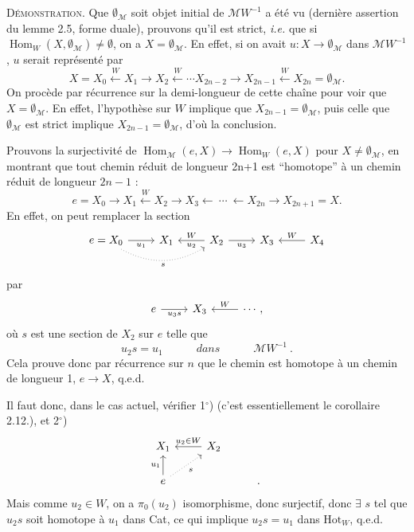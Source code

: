\documentclass[11pt]{article}
\newcommand{\printedpage}[1]{\marginpar{\footnotesize p.~#1}}
\newcommand{\msp}[1]{\marginpar{\footnotesize [#1]}}
\newcommand{\Hom}{\operatorname{Hom}}
\newcommand{\Hot}{\mathrm{Hot}}
\begin{document}
\textsc{Démonstration}. Que $\emptyset_{\mathcal{M}}$ soit objet initial de $\mathcal{M}W^{-1}$ a été vu (dernière assertion du lemme 2.5, forme duale), prouvons qu'il est strict, \textit{i.e.} que si $\Hom_W(X,\emptyset_{\mathcal{M}})\neq\emptyset$, on a $X=\emptyset_{\mathcal{M}}$. En effet, si on avait $u : X\longrightarrow\emptyset_{\mathcal{M}}$ dans $\mathcal{M}W^{-1}$, $u$ serait représenté par
\[
X=X_0\xleftarrow{\ W\ }X_1\longrightarrow X_2\xleftarrow{\ W\ }\cdots X_{2n-2}\longrightarrow X_{2n-1}\xleftarrow{\ W\ }X_{2n}=\emptyset_{\mathcal{M}}.
\]
On procède par récurrence sur la demi-longueur de cette chaîne pour voir que $X=\emptyset_{\mathcal{M}}$. En effet, l'hypothèse sur $W$ implique que $X_{2n-1}=\emptyset_{\mathcal{M}}$, puis celle que $\emptyset_{\mathcal{M}}$ est strict implique
$X_{2n-1}=\emptyset_{\mathcal{M}}$, d'où la conclusion. %

\msp{page 14'}
Prouvons la surjectivité de $\Hom_{\mathcal{M}}(e,X)\longrightarrow\Hom_W(e,X)$ pour $X\neq\emptyset_{\mathcal{M}}$, en montrant que tout chemin réduit de longueur 2n+1 est “homotope” à un chemin réduit de longueur $2n-1$ :
\[
e=X_0\longrightarrow X_1\xleftarrow{\ W\ }X_2\longrightarrow X_3\longleftarrow\ \cdots\ \longleftarrow X_{2n}\longrightarrow X_{2n+1}=X.
\]
En effet, on peut remplacer la section
\[
\begin{tikzcd}
e=X_0 \arrow[r,"u_1"'] \arrow[rr,dotted,bend right,"s"'] & X_1 & X_2 \arrow[l,"W"',"u_2"] \arrow[r,"u_3"'] & X_3 & X_4 \arrow[l,"W"']
\end{tikzcd}
\]
\printedpage{11}
par
\[
\begin{tikzcd}
e \arrow[r,"u_3s"'] & X_3 & \cdots, \arrow[l,"W"']
\end{tikzcd}
\]
où $s$ est une section de $X_2$ sur $e$ telle que
\[
u_2s=u_1\qquad\quad\textit{dans}\qquad\quad\mathcal{M}W^{-1}\ .
\]
Cela prouve donc par récurrence sur $n$ que le chemin est homotope à un chemin de longueur 1, $e\longrightarrow X$, q.e.d.

Il faut donc, dans le cas actuel, vérifier 1$^{\circ}$) (c'est essentiellement le corollaire 2.12.), et 2$^{\circ}$)
\[
\begin{tikzcd}
X_1 & X_2 \arrow[l,"u_2\in W"'] & \\
e \arrow[u,"u_1"] \arrow[ur,dotted,"s"'] & & .
\end{tikzcd}
\]
Mais comme $u_2\in W$, on a $\pi_0(u_2)$ isomorphisme, donc
\msp{page 15'}
surjectif, donc $\exists$ $s$ tel que $u_2s$ soit homotope à $u_1$ dans Cat, ce qui implique $u_2s=u_1$ dans $\Hot_W$, q.e.d.
\end{document}
